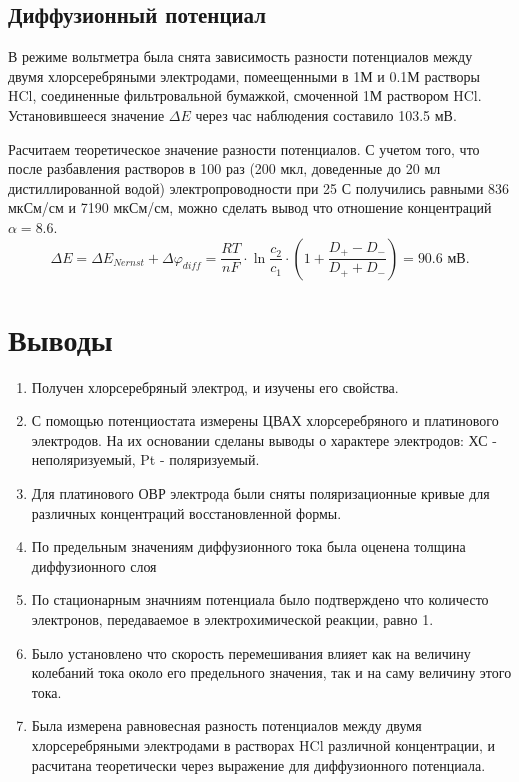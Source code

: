 \documentclass[a4paper, 12pt]{article}
\begin{document}
\subsection{Диффузионный потенциал}
В режиме вольтметра была снята зависимость разности потенциалов между двумя хлорсеребряными электродами, помеещенными в 1М и 0.1М растворы HCl, соединенные фильтровальной бумажкой, смоченной 1М раствором HCl. Установившееся значение $\Delta E$ через час наблюдения составило 103.5 мВ.

Расчитаем теоретическое значение разности потенциалов. С учетом того, что после разбавления растворов в 100 раз (200 мкл, доведенные до 20 мл дистиллированной водой) электропроводности при 25 С получились равными 836 мкСм/см и 7190 мкСм/см, можно сделать вывод что отношение концентраций $\alpha = 8.6$. 
$$
\Delta E = \Delta E_{Nernst} + \Delta \varphi_{diff} = \frac{R T}{n F} \cdot \ln \frac{c_{2}}{c_{1}} \cdot(1 + \frac{D_{+}-D_{-}}{D_{+}+D_{-}}) = 90.6 \text{ мВ}.
$$



 \section{Выводы}
\begin{enumerate}
    \item Получен хлорсеребряный электрод, и изучены его свойства.
    \item С помощью потенциостата измерены ЦВАХ хлорсеребряного и платинового электродов. На их основании сделаны выводы о характере электродов: ХС - неполяризуемый, Pt - поляризуемый. 
    \item Для платинового ОВР электрода были сняты поляризационные кривые для различных концентраций восстановленной формы.
    \item По предельным значениям диффузионного тока была оценена толщина диффузионного слоя
    \item По стационарным значниям потенциала было подтверждено что количесто электронов, передаваемое в электрохимической реакции, равно 1.
    \item Было установлено что скорость перемешивания влияет как на величину колебаний тока около его предельного значения, так и на саму величину этого тока.
    \item Была измерена равновесная разность потенциалов между двумя хлорсеребряными электродами в растворах HCl различной концентрации, и расчитана теоретически через выражение для диффузионного потенциала.
\end{enumerate}
\end{document}

